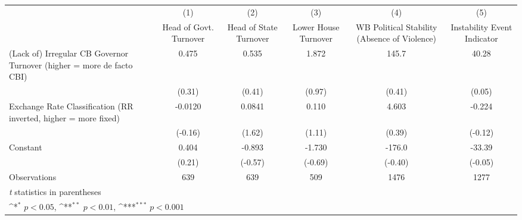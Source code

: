 {
\def\sym#1{\ifmmode^{#1}\else\(^{#1}\)\fi}
\begin{tabular*}{\linewidth}{@{\hskip\tabcolsep\extracolsep\fill}l*{5}{c}}
\hline\hline
                &\multicolumn{1}{c}{(1)}&\multicolumn{1}{c}{(2)}&\multicolumn{1}{c}{(3)}&\multicolumn{1}{c}{(4)}&\multicolumn{1}{c}{(5)}\\
                &\multicolumn{1}{c}{Head of Govt. Turnover}&\multicolumn{1}{c}{Head of State Turnover}&\multicolumn{1}{c}{Lower House Turnover}&\multicolumn{1}{c}{WB Political Stability (Absence of Violence)}&\multicolumn{1}{c}{Instability Event Indicator}\\
\hline
(Lack of) Irregular CB Governor Turnover (higher = more de facto CBI)&    0.475         &    0.535         &    1.872         &    145.7         &    40.28         \\
                &   (0.31)         &   (0.41)         &   (0.97)         &   (0.41)         &   (0.05)         \\
[1em]
Exchange Rate Classification (RR inverted, higher = more fixed)&  -0.0120         &   0.0841         &    0.110         &    4.603         &   -0.224         \\
                &  (-0.16)         &   (1.62)         &   (1.11)         &   (0.39)         &  (-0.12)         \\
[1em]
Constant        &    0.404         &   -0.893         &   -1.730         &   -176.0         &   -33.39         \\
                &   (0.21)         &  (-0.57)         &  (-0.69)         &  (-0.40)         &  (-0.05)         \\
\hline
Observations    &      639         &      639         &      509         &     1476         &     1277         \\
\hline\hline
\multicolumn{6}{l}{\footnotesize \textit{t} statistics in parentheses}\\
\multicolumn{6}{l}{\footnotesize \sym{*} \(p<0.05\), \sym{**} \(p<0.01\), \sym{***} \(p<0.001\)}\\
\end{tabular*}
}
